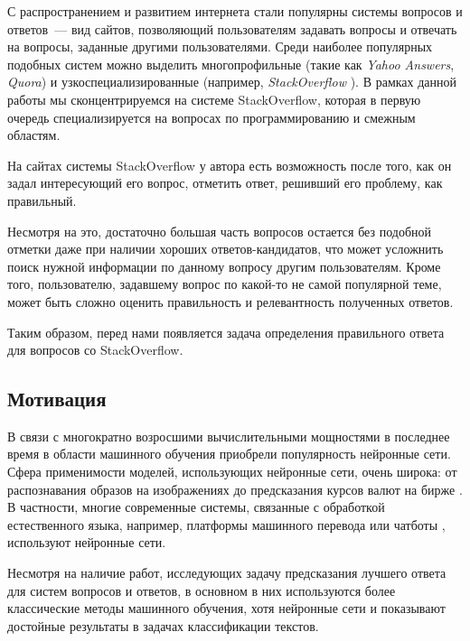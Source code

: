 \documentclass[../diploma.tex]{subfiles}
\begin{document}
        
	\label{sec:introduction}

    С распространением и развитием интернета стали популярны системы вопросов и ответов~--- вид сайтов, 
    позволяющий пользователям задавать вопросы и отвечать на вопросы, заданные другими пользователями.
    Среди наиболее популярных подобных систем можно выделить многопрофильные (такие как \textit{Yahoo Answers}, \textit{Quora}) 
    и узкоспециализированные (например, \textit{StackOverflow} \cite{online:stackoverflow}).
    В рамках данной работы мы сконцентрируемся на системе StackOverflow, 
    которая в первую очередь специализируется на вопросах по программированию и смежным областям.

    На сайтах системы StackOverflow у автора есть возможность после того, как он задал интересующий его вопрос, отметить ответ, решивший его проблему, как правильный.
    
    Несмотря на это, достаточно большая часть вопросов остается без подобной отметки даже при наличии хороших ответов-кандидатов, 
    что может усложнить поиск нужной информации по данному вопросу другим пользователям. 
    Кроме того, пользователю, задавшему вопрос по какой-то не самой популярной теме, может быть сложно оценить правильность и релевантность полученных ответов.

    Таким образом, перед нами появляется задача определения правильного ответа для вопросов со StackOverflow.
       
    \subsection*{Мотивация}
	
	В связи с многократно возросшими вычислительными мощностями в последнее время в области машинного обучения приобрели популярность нейронные сети.
    Сфера применимости моделей, использующих нейронные сети, очень широка: 
    от распознавания образов на изображениях \cite{article:cnn} до предсказания курсов валют на бирже \cite{article:currency}.
    В частности, многие современные системы, связанные с обработкой естественного языка, 
    например, платформы машинного перевода \cite{article:nmt} или чатботы \cite{article:chatbot}, используют нейронные сети.

    Несмотря на наличие работ, исследующих задачу предсказания лучшего ответа для систем вопросов и ответов, 
    в основном в них используются более классические методы машинного обучения,
    хотя нейронные сети и показывают достойные результаты в задачах классификации текстов.
\end{document}
